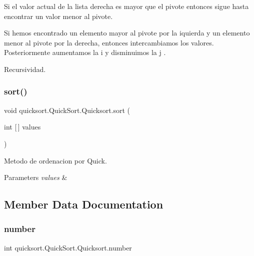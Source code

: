 Si el valor actual de la lista derecha es mayor que el pivote entonces sigue hasta encontrar un valor menor al pivote.

Si hemos encontrado un elemento mayor al pivote por la iquierda y un elemento menor al pivote por la derecha, entonces intercambiamos los valores. Posteriormente aumentamos la i y disminuimos la j .

Recursividad.\hypertarget{classquicksort_1_1_quick_sort_1_1_quicksort_adf33161c7c6f5bab86ad6c4f512f850c}{}\label{classquicksort_1_1_quick_sort_1_1_quicksort_adf33161c7c6f5bab86ad6c4f512f850c} 
\subsubsection{\texorpdfstring{sort()}{sort()}}
{\footnotesize\ttfamily void quicksort.\+Quick\+Sort.\+Quicksort.\+sort (\begin{DoxyParamCaption}\item[{int \mbox{[}$\,$\mbox{]}}]{values }\end{DoxyParamCaption})}



Metodo de ordenacion por Quick. 


\begin{DoxyParams}{Parameters}
{\em values} & \\
\hline
\end{DoxyParams}


\subsection{Member Data Documentation}
\hypertarget{classquicksort_1_1_quick_sort_1_1_quicksort_a1ccb00d85f76e7150e0746b42038225f}{}\label{classquicksort_1_1_quick_sort_1_1_quicksort_a1ccb00d85f76e7150e0746b42038225f} 
\subsubsection{\texorpdfstring{number}{number}}
{\footnotesize\ttfamily int quicksort.\+Quick\+Sort.\+Quicksort.\+number\hspace{0.3cm}{\ttfamily [private]}}


